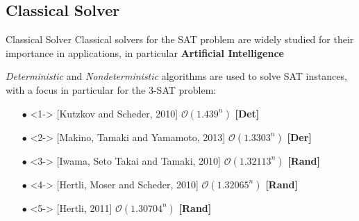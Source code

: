 	\subsection{Classical Solver}
		\begin{frame}{Classical Solver}
			\small
			Classical solvers for the SAT problem are widely studied for their importance in applications, in particular \textbf{Artificial Intelligence} \\
			
			\vspace{0.3cm}
			
			\emph{Deterministic} and \emph{Nondeterministic} algorithms are used to solve SAT instances, with a focus in particular for the 3-SAT problem:
			\begin{itemize}
				\item[$\bullet$] <1-> [Kutzkov and Scheder, 2010] $\mathcal{O}(1.439^n)$ \textbf{[Det]}
				
				\item[$\bullet$] <2-> [Makino, Tamaki and Yamamoto, 2013] $\mathcal{O}(1.3303^n)$ \textbf{[Der]}
				
				\item[$\bullet$] <3-> [Iwama, Seto Takai and Tamaki, 2010] $\mathcal{O}(1.32113^n)$ \textbf{[Rand]}
				
				\item[$\bullet$] <4-> [Hertli, Moser and Scheder, 2010] $\mathcal{O}(1.32065^n)$ \textbf{[Rand]}
				
				\item[$\bullet$] <5-> [Hertli, 2011] $\mathcal{O}(1.30704^n)$ \textbf{[Rand]}
			\end{itemize}
		\end{frame}
	
